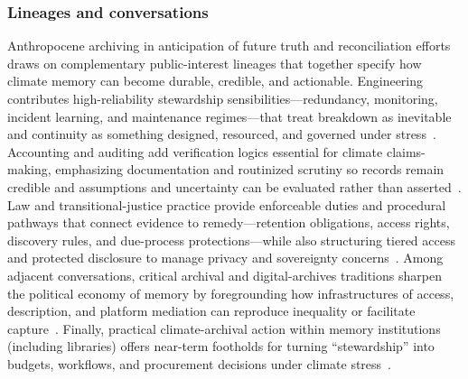 \documentclass[acmsmall,screen]{acmart}
\begin{document}
\subsubsection*{Lineages and conversations}
Anthropocene archiving in anticipation of future truth and reconciliation efforts draws on complementary public-interest lineages that together specify how climate memory can become durable, credible, and actionable. Engineering contributes high-reliability stewardship sensibilities—redundancy, monitoring, incident learning, and maintenance regimes—that treat breakdown as inevitable and continuity as something designed, resourced, and governed under stress~\cite{wessellKeepingArchivesWater2023,mazurczykAmericanArchivesClimate2018}. Accounting and auditing add verification logics essential for climate claims-making, emphasizing documentation and routinized scrutiny so records remain credible and assumptions and uncertainty can be evaluated rather than asserted~\cite{paschalidouStrongSustainabilityFramework2022a,orrClimateChangeCultural2021}. Law and transitional-justice practice provide enforceable duties and procedural pathways that connect evidence to remedy—retention obligations, access rights, discovery rules, and due-process protections—while also structuring tiered access and protected disclosure to manage privacy and sovereignty concerns~\cite{robinson-sweetTruthReconciliationArchivists2018,ghaddarSpectreArchiveTruth2016}. Among adjacent conversations, critical archival and digital-archives traditions sharpen the political economy of memory by foregrounding how infrastructures of access, description, and platform mediation can reproduce inequality or facilitate capture~\cite{carbajalCriticalDigitalArchives2021a,woodMobilizingRecordsReframing2014}. Finally, practical climate-archival action within memory institutions (including libraries) offers near-term footholds for turning “stewardship” into budgets, workflows, and procurement decisions under climate stress~\cite{ajaniLibrariesClimateChange2025,robinsonComeHellHigh2021}.
\end{document}
